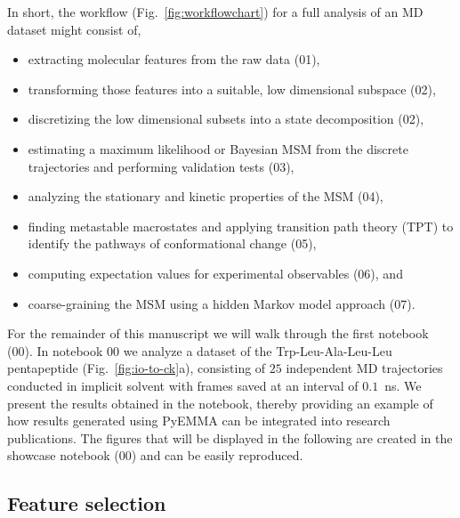\documentclass[9pt,tutorial]{livecoms}
\begin{document}
In short, the workflow (Fig.~\ref{fig:workflowchart}) for a full analysis of an MD dataset might consist of,
\begin{itemize}
	\item extracting molecular features from the raw data (01),
	\item transforming those features into a suitable, low dimensional subspace (02),
	\item discretizing the low dimensional subsets into a state decomposition (02),
	\item estimating a maximum likelihood or Bayesian MSM from the discrete trajectories and performing validation tests (03),
	\item analyzing the stationary and kinetic properties of the MSM (04),
	\item finding metastable macrostates and applying transition path theory (TPT) to identify the pathways of conformational change (05),
	\item computing expectation values for experimental observables (06), and
	\item coarse-graining the MSM using a hidden Markov model approach (07).
\end{itemize}

For the remainder of this manuscript we will walk through the first notebook (00). In notebook 00 we analyze a dataset of the Trp-Leu-Ala-Leu-Leu pentapeptide (Fig.~\ref{fig:io-to-ck}a), consisting of $25$ independent MD trajectories conducted in implicit solvent with frames saved at an interval of $0.1$~ns. We present the results obtained in the notebook, thereby providing an example of how results generated using PyEMMA can be integrated into research publications.
The figures that will be displayed in the following are created in the showcase notebook (00) and can be easily reproduced.

\subsection{Feature selection}
\end{document}
